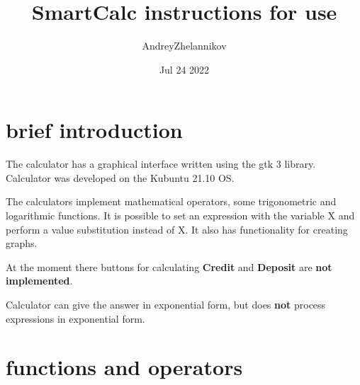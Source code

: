 \documentclass[12pt, a4paper]{article}
\title{SmartCalc instructions for use}
\author{AndreyZhelannikov}
\date{Jul 24 2022}
\begin{document}
\maketitle

\pagebreak

\tableofcontents

\pagebreak

\section{brief introduction}





The calculator has a graphical interface written using the gtk 3 library.
Calculator was developed on the Kubuntu 21.10 OS.

The calculators implement mathematical operators, some trigonometric and logarithmic functions. It is possible to set an expression with the variable X and perform a value substitution instead of X. It also has functionality for creating graphs.

At the moment there buttons for calculating \textbf{Credit} and \textbf{Deposit} are \textbf{not implemented}.

Calculator can give the answer in exponential form, but does \textbf{not} process expressions in exponential form.

\pagebreak

\section{functions and operators}
\end{document}
